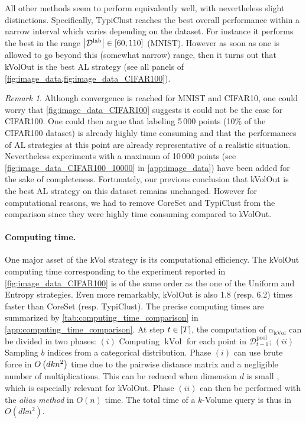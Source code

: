 \documentclass[twoside]{article}
\DeclareMathOperator{\kvol}{kVol}
\theoremstyle{definition}
\theoremstyle{remark}
\newtheorem*{remark}{Remark}
\newcommand{\Dlab}{\mathcal{D}^{\mathrm{lab}}}
\newcommand{\Dpool}{\mathcal{D}^{\mathrm{pool}}}
\begin{document}
%
All other methods seem to perform equivalently well, with nevertheless slight distinctions. Specifically, TypiClust reaches the best overall performance within a narrow interval which varies depending on the dataset. For instance it performs the best in the range $\abs{\Dlab} \in [60, 110]$ (MNIST).  
%
However as soon as one is allowed to go beyond this (somewhat narrow) range, then it turns out that kVolOut is the best AL strategy (see all panels of \cref{fig:image_data,fig:image_data_CIFAR100}).
%
\begin{remark}
    Although convergence is reached for MNIST and CIFAR10, one could worry that \cref{fig:image_data_CIFAR100} suggests it could not be the case for CIFAR100. 
    One could then argue that labeling 5\,000 points (10\% of the CIFAR100 dataset) is already highly time consuming and that the performances of AL strategies at this point are already representative of a realistic situation.
    Nevertheless experiments with a maximum of 10\,000 points (see \cref{fig:image_data_CIFAR100_10000} in \cref{app:image_data}) have been added for the sake of completeness. 
    Fortunately, our previous conclusion that kVolOut is the best AL strategy on this dataset remains unchanged.
    However for computational reasons, we had to remove CoreSet and TypiClust from the comparison since they were highly time consuming compared to kVolOut.
\end{remark}

\paragraph{Computing time.}
One major asset of the kVol strategy is its computational efficiency.
The kVolOut computing time corresponding to the experiment reported in \cref{fig:image_data_CIFAR100} is of the same order as the one of the Uniform and Entropy strategies.
%
Even more remarkably, kVolOut is also 1.8 (resp. 6.2) times faster than CoreSet (resp. TypiClust). 
%
The precise computing times are summarized by \cref{tab:computing_time_comparison} in \cref{app:computing_time_comparison}.
%
At step $t\in\left[T\right]$, the computation of $\alpha_{\kvol}$ can be divided in two phases: $(i)$ Computing $\kvol$ for each point in $\Dpool_{t-1}$; $(ii)$ Sampling $b$ indices from a categorical distribution.
Phase $(i)$ can use brute force in $O\left(dkn^2\right)$ time due to the pairwise distance matrix and a negligible number of multiplications. This can be reduced when dimension $d$ is small \citep{vaidyaAnOnLognAlgorithm1989}, which is especially relevant for kVolOut.
Phase $(ii)$ can then be performed with the \emph{alias method} \citep{voseLinearAlgorithmGenerating1991} in $O(n)$ time.
The total time of a $k$-Volume query is thus in $O(dkn^2)$.
\end{document}
